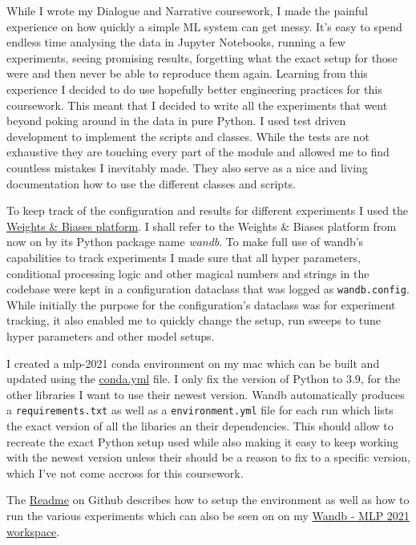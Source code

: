 \documentclass[a4paper]{article}
\begin{document}
    While I wrote my Dialogue and Narrative coursework, I made the painful experience on how quickly a
    simple ML system can get messy. It's
    easy to spend endless time analysing the data in Jupyter Notebooks, running a few experiments, seeing promising results,
    forgetting what the exact setup for those were and then never be able to reproduce them again. Learning from this
    experience I decided to do use hopefully better engineering practices for this coursework. This meant
    that I decided to write all the experiments that went beyond poking around in the data in pure Python. I used test
    driven development to implement the scripts and classes. While the tests are not exhaustive they are touching every
    part of the module and allowed me to find countless mistakes I inevitably made. They also serve as a nice and living
    documentation how to use the different classes and scripts.

    To keep track of the configuration and results for different experiments I used the
    \href{https://wandb.ai/site}{Weights \& Biases platform}\cite{wandb}.
    I shall refer to the Weights \& Biases platform from now on by its Python package name \textit{wandb}. To make full
    use of wandb's capabilities to track experiments I made sure that all hyper parameters,
    conditional processing logic and other magical numbers and strings in the codebase were kept in a configuration
    dataclass that was logged as \texttt{wandb.config}. While initially the purpose for the configuration's dataclass was for experiment
    tracking, it also enabled me to quickly change the setup, run sweeps to tune hyper parameters and other model setups.

    I created a mlp-2021 conda environment on my mac \cite{conda-forge} which can be built and updated using the
    \href{https://github.com/isabelladegen/mlp-2021/blob/main/conda.yml}{conda.yml} file. I only fix the version of Python to 3.9,
    for the other libraries I want to use their newest version. Wandb automatically produces a \texttt{requirements.txt}
    as well as a \texttt{environment.yml} file for each run which lists the exact version of all the libaries an their
    dependencies. This should allow to recreate the exact Python setup used while also making it easy to keep working with
    the newest version unless their should be a reason to fix to a specific version, which I've not come accross for this coursework.

    The \href{https://github.com/isabelladegen/mlp-2021}{Readme} on Github describes how to setup the environment as well
    as how to run the various experiments which can also be seen on on my \href{https://wandb.ai/idegen/mlp-2021}{Wandb - MLP 2021 workspace}.
\end{document}

